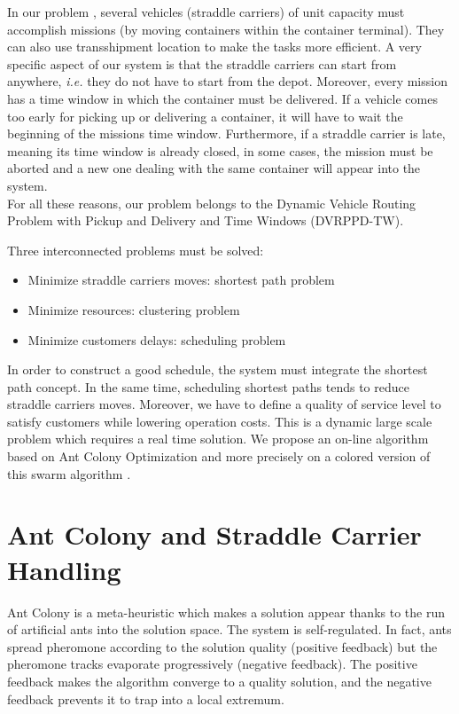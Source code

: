 \documentclass[journal]{IEEEtran}
\begin{document}
In our problem \cite{Lesauvage08}, several vehicles (straddle carriers) of
unit capacity must accomplish missions (by moving containers within the
container terminal). They can also use transshipment location to make the tasks
more efficient. A very specific aspect of our system is that the straddle
carriers can start from anywhere, \textit{i.e.} they do not have to start from the
depot. Moreover, every mission has a time window in which the container must be
delivered. If a vehicle comes too early for picking up or delivering a
container, it will have to wait the beginning of the missions time window.
Furthermore, if a straddle carrier is late, meaning its time window is already
closed, in some cases, the mission must be aborted and a new one dealing with the same
container will appear into the system.\\

For all these reasons, our problem belongs to the Dynamic Vehicle Routing
Problem with Pickup and Delivery and Time Windows (DVRPPD-TW). 

Three interconnected problems must be solved:
\begin{itemize}
	\item Minimize straddle carriers moves: shortest path problem
	\item Minimize resources: clustering problem
	\item Minimize customers delays: scheduling problem
\end{itemize}

In order to construct a good schedule, the system must integrate the shortest
path concept. In the same time, scheduling shortest paths tends to reduce
straddle carriers moves. Moreover, we have to define a quality of service level
to satisfy customers while lowering operation costs. This is a dynamic large
scale problem which requires a real time solution. We propose an on-line
algorithm based on Ant Colony Optimization \cite{Dorigo91,Dorigo97} and
more precisely on a colored version of this swarm algorithm \cite{Bertelle02}.

\section{Ant Colony and Straddle Carrier Handling}
Ant Colony \cite{Dorigo91,Dorigo97} is a meta-heuristic which makes a
solution appear thanks to the run of artificial ants into the solution space.
The system is self-regulated. In fact, ants spread pheromone according to the
solution quality (positive feedback) but the pheromone tracks evaporate
progressively (negative feedback). The positive feedback makes the algorithm
converge to a quality solution, and the negative feedback prevents it to trap
into a local extremum.
\end{document}
